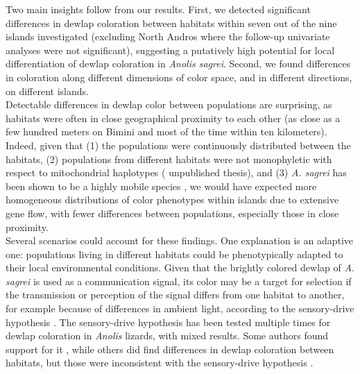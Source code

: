 Two main insights follow from our results. First, we detected significant differences in dewlap coloration between habitats within seven out of the nine islands investigated (excluding North Andros where the follow-up univariate analyses were not significant), suggesting a putatively high potential for local differentiation of dewlap coloration in \textit{Anolis sagrei}. Second, we found differences in coloration along different dimensions of color space, and in different directions, on different islands.\\

Detectable differences in dewlap color between populations are surprising, as habitats were often in close geographical proximity to each other (as close as a few hundred meters on Bimini and most of the time within ten kilometers). Indeed, given that (1) the populations were continuously distributed between the habitats, (2) populations from different habitats were not monophyletic with respect to mitochondrial haplotypes (\citealt{vandeSchoot2016} unpublished thesis), and (3) \textit{A. sagrei} has been shown to be a highly mobile species \citep{Kamath2018}, we would have expected more homogeneous distributions of color phenotypes within islands due to extensive gene flow, with fewer differences between populations, especially those in close proximity.\\

Several scenarios could account for these findings. One explanation is an adaptive one: populations living in different habitats could be phenotypically adapted to their local environmental conditions. Given that the brightly colored dewlap of \textit{A. sagrei} is used as a communication signal, its color may be a target for selection if the transmission or perception of the signal differs from one habitat to another, for example because of differences in ambient light, according to the sensory-drive hypothesis \citep{Endler1988, Endler1992, Endler1998}. The sensory-drive hypothesis has been tested multiple times for dewlap coloration in \textit{Anolis} lizards, with mixed results. Some authors found support for it \citep{Leal2002, Leal2004}, while others did find differences in dewlap coloration between habitats, but those were inconsistent with the sensory-drive hypothesis \citep{Fleishman2009, Ng2012}.\\

